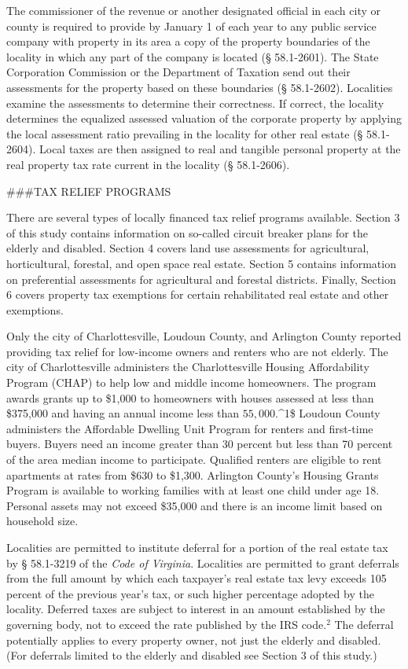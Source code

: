 \documentclass[
]{book}
\begin{document}
The commissioner of the revenue or another designated official in each city or county is required to provide by
January 1 of each year to any public service company with property in its area a copy of the property boundaries of
the locality in which any part of the company is located (§ 58.1-2601). The State Corporation Commission or the
Department of Taxation send out their assessments for the property based on these boundaries (§ 58.1-2602). Localities examine the assessments to determine their correctness. If correct, the locality determines the equalized assessed valuation of the corporate property by applying the local assessment ratio prevailing in the locality for other real estate (§ 58.1-2604). Local taxes are then assigned to real and tangible personal property at the real property tax rate current in the locality (§ 58.1-2606).

\#\#\#TAX RELIEF PROGRAMS

There are several types of locally financed tax relief programs available. Section 3 of this study contains information on so-called circuit breaker plans for the elderly and disabled. Section 4 covers land use assessments for agricultural, horticultural, forestal, and open space real estate. Section 5 contains information on preferential assessments for
agricultural and forestal districts. Finally, Section 6 covers property tax exemptions for certain rehabilitated real estate and other exemptions.

Only the city of Charlottesville, Loudoun County, and Arlington County reported providing tax relief for low-income
owners and renters who are not elderly. The city of Charlottesville administers the Charlottesville Housing Affordability Program (CHAP) to help low and middle income homeowners. The program awards grants up to \$1,000 to homeowners with houses assessed at less than \$375,000 and having an annual income less than \(55,000.\)\^{}1\$ Loudoun County administers the Affordable Dwelling Unit Program for renters and first-time buyers. Buyers need an income greater than 30 percent but less than 70 percent of the area median income to participate. Qualified renters are eligible to rent apartments at rates from \$630 to \$1,300. Arlington County's Housing Grants Program is available to working families with at least one child under age 18. Personal assets may not exceed \$35,000 and there is an income limit based on household size.

Localities are permitted to institute deferral for a portion of the real estate tax by § 58.1-3219 of the \emph{Code of Virginia}. Localities are permitted to grant deferrals from the full amount by which each taxpayer's real estate tax levy exceeds 105 percent of the previous year's tax, or such higher percentage adopted by the locality. Deferred taxes are subject to interest in an amount established by the governing body, not to exceed the rate published by the IRS code.\(^2\) The deferral potentially applies to every property owner, not just the elderly and disabled. (For deferrals limited to the elderly and disabled see Section 3 of this study.)
\end{document}
